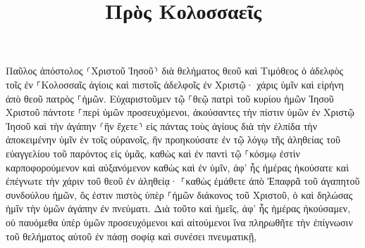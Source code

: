 \documentclass{openreader}
\title{Πρὸς Κολοσσαεῖς}
\date{}
\begin{document}
\maketitle
\raggedbottom 
\fontsize{16pt}{24pt}\selectfont


Παῦλος ἀπόστολος ⸂Χριστοῦ Ἰησοῦ⸃ διὰ θελήματος θεοῦ καὶ Τιμόθεος ὁ ἀδελφὸς 
τοῖς ἐν ⸀Κολοσσαῖς ἁγίοις καὶ πιστοῖς ἀδελφοῖς ἐν Χριστῷ· χάρις ὑμῖν καὶ εἰρήνη ἀπὸ θεοῦ πατρὸς ⸀ἡμῶν. 
Εὐχαριστοῦμεν τῷ ⸀θεῷ πατρὶ τοῦ κυρίου ἡμῶν Ἰησοῦ Χριστοῦ πάντοτε ⸀περὶ ὑμῶν προσευχόμενοι, 
ἀκούσαντες τὴν πίστιν ὑμῶν ἐν Χριστῷ Ἰησοῦ καὶ τὴν ἀγάπην ⸂ἣν ἔχετε⸃ εἰς πάντας τοὺς ἁγίους 
διὰ τὴν ἐλπίδα τὴν ἀποκειμένην ὑμῖν ἐν τοῖς οὐρανοῖς, ἣν προηκούσατε ἐν τῷ λόγῳ τῆς ἀληθείας τοῦ εὐαγγελίου 
τοῦ παρόντος εἰς ὑμᾶς, καθὼς καὶ ἐν παντὶ τῷ ⸀κόσμῳ ἐστὶν καρποφορούμενον καὶ αὐξανόμενον καθὼς καὶ ἐν ὑμῖν, ἀφ’ ἧς ἡμέρας ἠκούσατε καὶ ἐπέγνωτε τὴν χάριν τοῦ θεοῦ ἐν ἀληθείᾳ· 
⸀καθὼς ἐμάθετε ἀπὸ Ἐπαφρᾶ τοῦ ἀγαπητοῦ συνδούλου ἡμῶν, ὅς ἐστιν πιστὸς ὑπὲρ ⸀ἡμῶν διάκονος τοῦ Χριστοῦ, 
ὁ καὶ δηλώσας ἡμῖν τὴν ὑμῶν ἀγάπην ἐν πνεύματι. 
Διὰ τοῦτο καὶ ἡμεῖς, ἀφ’ ἧς ἡμέρας ἠκούσαμεν, οὐ παυόμεθα ὑπὲρ ὑμῶν προσευχόμενοι καὶ αἰτούμενοι ἵνα πληρωθῆτε τὴν ἐπίγνωσιν τοῦ θελήματος αὐτοῦ ἐν πάσῃ σοφίᾳ καὶ συνέσει πνευματικῇ, 
\end{document}
